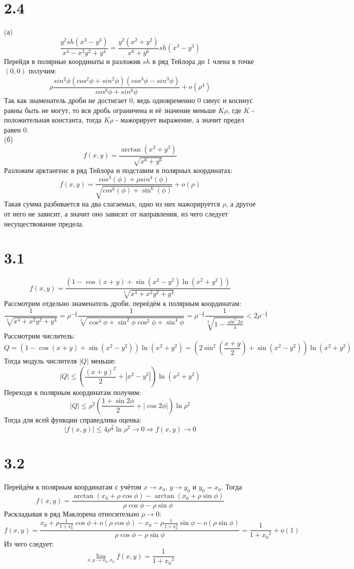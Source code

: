 \documentclass[12pt]{article}
\begin{document}
\section{2.4}
(а) 
$$\frac{y^2sh(x^3 - y^3)}{x^4 - x^2y^2 + y^4} = \frac{y^2(x^2 + y^2)}{x^6 + y^6} sh(x^3 - y^3)$$
Перейдя в полярные координаты и разложив $sh$ в ряд Тейлора до 1 члена в точке $(0, 0)$ получим:
$$
\rho \frac{sin^2{\phi}(cos^2{\phi} + sin^2{\phi})(cos^3{\phi} - sin^3{\phi})}{cos^6{\phi} + sin^6{\phi}} + o(\rho^4)
$$
Так как знаменатель дроби не достигает $0$, ведь одновременно $0$ синус и косинус равны быть не могут, то вся дробь ограничена и её значение меньше $K\rho$, 
где $K$ - положительная константа, тогда $K\rho$ - мажорирует выражение, а значит предел равен $0$.
\\(б)
$$f(x, y) = \frac{\arctan(x^3 + y^3)}{\sqrt{x^6 + y^6}}$$
Разложим арктангенс в ряд Тейлора и подставим в полярных координатах:
$$f(x, y) = \frac{cos^3(\phi) + \rho sin^4(\phi)}{\sqrt{cos^6(\phi) + \sin^6(\phi)}} + o(\rho)$$
Такая сумма разбивается на два слагаемых, одно из них мажорируется $\rho$, а другое от него не зависит, а значит оно зависит от направления, из чего следует несуществование предела.

\section{3.1}
$$f(x, y) = \frac{(1 - \cos(x+y) + \sin(x^2 - y^2)\ln(x^2 + y^2))}{\sqrt[3]{x^4 + x^2y^2 + y^4}}$$
Рассмотрим отдельно знаменатель дроби, переёдём к полярным координатам:
$$\frac{1}{\sqrt[3]{x^4 + x^2y^2 + y^4}} = 
\rho^{-\frac{4}{3}}\frac{1}{\sqrt[3]{\cos^4{\phi} + \sin^2{\phi}\cos^2{\phi} + \sin^4{\phi}}} = 
\rho^{-\frac{4}{3}}\frac{1}{\sqrt[3]{1 - \frac{\sin^2{2\phi}}{4}}} < 2\rho^{-\frac{4}{3}}$$
Рассмотрим числитель:
$$Q = (1 - \cos(x+y) + \sin(x^2 - y^2))\ln(x^2 + y^2) = 
(2\sin^2\left(\frac{x+y}{2}\right) + \sin(x^2 - y^2))\ln(x^2 + y^2)
$$
Тогда модуль числителя $|Q|$ меньше:
$$
|Q| \leq \left(\frac{(x+y)^2}{2} + |x^2 - y^2|\right)\ln(x^2 + y^2)
$$
Переходя к полярным координатам получим:
$$
|Q| \leq \rho^2\left(\frac{1 + \sin{2\phi}}{2} + |\cos{2\phi}|\right)\ln{\rho^2}
$$
Тогда для всей функции справедлива оценка:
$$
|f(x, y)| \leq 4\rho^{\frac{2}{3}}\ln{\rho^2} \to 0 \Rightarrow f(x, y) \to 0
$$

\section{3.2}
Перейдём к полярным координатам с учётом \(x \to  x_0\), \(y \to  y_0\) и \(y_0 = x_0\). Тогда
\[
    f(x, y) = \frac{\arctan(x_0 + \rho \cos{\phi}) - \arctan(x_0 + \rho \sin{\phi})}{\rho \cos{\phi} - \rho \sin{\phi}}
\]  
Раскладывая в ряд Маклорена относительно $\rho \to 0$:
\[
    f(x, y) = 
    \frac{x_0 + \rho \frac{1}{1 + x_0^2}\cos{\phi} + o(\rho \cos{\phi}) - x_0 - \rho \frac{1}{1 + x_0^2}\sin{\phi} - o(\rho \sin{\phi})}{\rho \cos{\phi} - \rho \sin{\phi}} = 
    \frac{1}{1 + {x_0}^{2}} + o(1)
\]
Из чего следует: 
\[
    \lim_{x, y \to x_0, x_0}{f(x, y)} = \frac{1}{1 + {x_0}^{2}} 
\]
\end{document}
